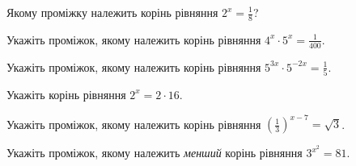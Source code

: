\documentclass[12pt]{article}
\begin{document}
\begin{samepage}
\noindent\zadnum Якому проміжку належить корінь рівняння $2^x = \displaystyle\frac{1}{8}$? 

\nmtnobreak
\answerTable{$(2; 4]$}{$(-6; -4]$}{$(-2; 0]$}{$(0; 2]$}{$(-4; -2]$}

\nmtnobreak
\par{}\vspace{0.25cm}
\end{samepage}

\begin{samepage}
\noindent\zadnum Укажіть проміжок, якому належить корінь рівняння $4^x \cdot 5^x = \displaystyle\frac{1}{400}$. 

\nmtnobreak
\answerTable{$[2; +\infty)$}{$[-0{,}5; 2)$}{$[-2; -0{,}5)$}{$[-10; -2)$}{$(-\infty; -10)$}
\par{}
\end{samepage}

\begin{samepage}
\noindent\zadnum Укажіть проміжок, якому належить корінь рівняння $5^{3x} \cdot 5^{-2x} = \displaystyle\frac{1}{5}$. 

\nmtnobreak
\answerTable{$(-\infty; -1]$}{$(-1; -0{,}5]$}{$(-0{,}5; 0]$}{$(0{,}5; +\infty)$}{$(0; 0{,}5]$}
\par{}
\end{samepage}

\begin{samepage}
\noindent\zadnum Укажіть корінь рівняння $2^x = 2 \cdot 16$. 

\nmtnobreak
{}
\par{}
\end{samepage}

\begin{samepage}
\noindent\zadnum Укажіть проміжок, якому належить корінь рівняння $\left(\displaystyle\frac{1}{3}\right)^{x-7} = \sqrt{3}$. 

\nmtnobreak
\answerTable{$(7; 10]$}{$(-4; 4)$}{$(-6; -4]$}{$(4; 7]$}{$[-7; -6]$}
\par{}
\end{samepage}

\begin{samepage}
\noindent\zadnum Укажіть проміжок, якому належить \textit{менший} корінь рівняння $3^{x^2} = 81$. 

\nmtnobreak
\answerTable{$[-2; 0)$}{$(2; +\infty)$}{$[-3; -2)$}{$[0; 2)$}{$(-\infty; -3)$}
\par{}
\end{samepage}
\end{document}
